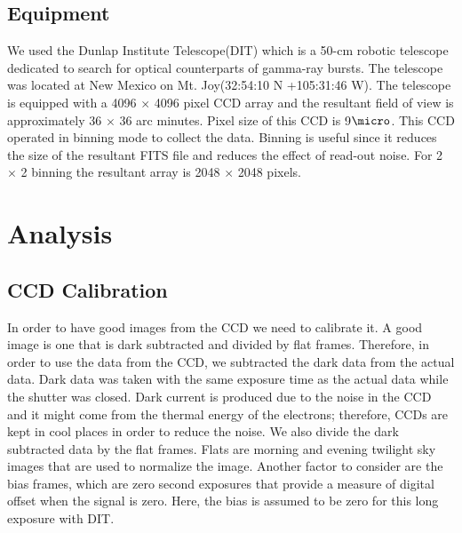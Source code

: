 \documentclass[letterpaper,12pt]{article}
\begin{document}
\subsection{Equipment}
We used the Dunlap Institute Telescope(DIT) which is a 50-cm robotic telescope dedicated to search for optical counterparts of gamma-ray bursts. The telescope was located at New Mexico on Mt. Joy(32:54:10 N +105:31:46 W).  The telescope is equipped with a 4096 \begin{math}\times\end{math} 4096 pixel CCD array and the resultant field of view is approximately 36 \begin{math}\times\end{math} 36 arc minutes. Pixel size of this CCD is 9\begin{math}\micro\end{math}. This CCD operated in binning mode to collect the data. Binning is useful since it reduces the size of the resultant FITS file and reduces the effect of read-out noise. For 2 \begin{math}\times\end{math} 2 binning the resultant array is 2048 \begin{math}\times\end{math} 2048 pixels.



\section{Analysis}
\label{analysis}
\subsection{CCD Calibration}
In order to have good images from the CCD we need to calibrate it. A good image is one that is dark subtracted and divided by flat frames. Therefore, in order to use the data from the CCD, we subtracted the dark data from the actual data. Dark data was taken with the same exposure time as the actual data while  the shutter was closed. Dark current is produced due to the noise in the CCD and it might come from the thermal energy of the electrons; therefore, CCDs are kept in cool places in order to reduce the noise. We also divide the dark subtracted data by the flat frames. Flats are morning and evening twilight sky images that are used to normalize the image. Another factor to consider are the bias frames, which are zero second exposures that provide a measure of digital offset when the signal is zero. Here, the bias is assumed to be zero for this long exposure with DIT.
\end{document}
